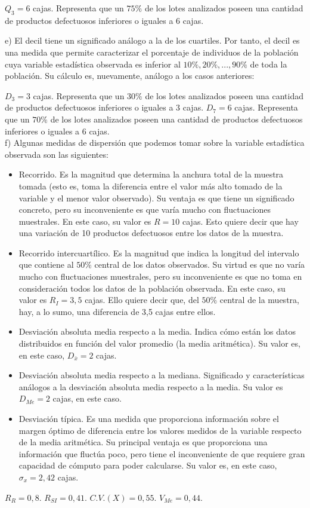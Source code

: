 $Q_{3} = 6$ cajas. Representa que un $75\%$ de los lotes analizados poseen una cantidad de productos defectuosos inferiores o iguales a 6 cajas.

e) El decil tiene un significado análogo a la de los cuartiles. Por tanto, el decil es una medida que permite caracterizar el porcentaje de individuos de la población cuya variable estadística observada es inferior al $10\%, 20\%,..., 90\%$ de toda la población. Su cálculo es, nuevamente, análogo a los casos anteriores: 

$D_{3} = 3$ cajas. Representa que un $30\%$ de los lotes analizados poseen una cantidad de productos defectuosos inferiores o iguales a 3 cajas.
$D_{7} = 6$ cajas. Representa que un $70\%$ de los lotes analizados poseen una cantidad de productos defectuosos inferiores o iguales a 6 cajas. \\

f) Algunas medidas de dispersión que podemos tomar sobre la variable estadística observada son las siguientes:

\begin{itemize}
	
	\item Recorrido. Es la magnitud que determina la anchura total de la muestra tomada (esto es, toma la diferencia entre el valor más alto tomado de la variable y el menor valor observado). Su ventaja es que tiene un significado concreto, pero su inconveniente es que varía mucho con fluctuaciones muestrales. En este caso, su valor es $R = 10$ cajas. Esto quiere decir que hay una variación de 10 productos defectuosos entre los datos de la muestra.
	
	\item Recorrido intercuartílico. Es la magnitud que indica la longitud del intervalo que contiene al $50\%$ central de los datos observados. Su virtud es que no varía mucho con fluctuaciones muestrales, pero su inconveniente es que no toma en consideración todos los datos de la población observada. En este caso, su valor es $R_{I} = 3,5$ cajas. Ello quiere decir que, del $50\%$ central de la muestra, hay, a lo sumo, una diferencia de 3,5 cajas entre ellos.
	
	\item Desviación absoluta media respecto a la media. Indica cómo están los datos distribuidos en función del valor promedio (la media aritmética). Su valor es, en este caso, $D_{\bar x} = 2$ cajas.
	
	\item Desviación absoluta media respecto a la mediana. Significado y características análogos a la desviación absoluta media respecto a la media. Su valor es $D_{Me} = 2$ cajas, en este caso.
	
	\item Desviación típica. Es una medida que proporciona información sobre el margen óptimo de diferencia entre los valores medidos de la variable respecto de la media aritmética. Su principal ventaja es que proporciona una información que fluctúa poco, pero tiene el inconveniente de que requiere gran capacidad de cómputo para poder calcularse. Su valor es, en este caso, $\sigma_{x} = 2,42$ cajas.
\end{itemize}



$R_{R} = 0,8$.
$R_{SI} = 0,41$.
$C.V.(X) = 0,55$.
$V_{Me} = 0,44$.